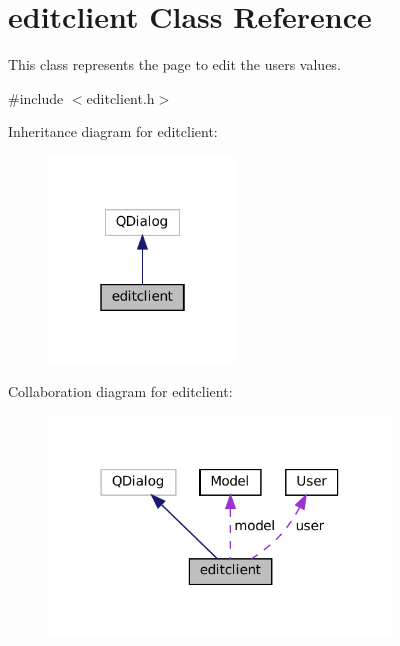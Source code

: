\hypertarget{classeditclient}{}\section{editclient Class Reference}
\label{classeditclient}


This class represents the page to edit the user\textquotesingle{}s values.  




{\ttfamily \#include $<$editclient.\+h$>$}



Inheritance diagram for editclient\+:\nopagebreak
\begin{figure}[H]
\begin{center}
\leavevmode
\includegraphics[width=142pt]{classeditclient__inherit__graph}
\end{center}
\end{figure}


Collaboration diagram for editclient\+:\nopagebreak
\begin{figure}[H]
\begin{center}
\leavevmode
\includegraphics[width=258pt]{classeditclient__coll__graph}
\end{center}
\end{figure}
